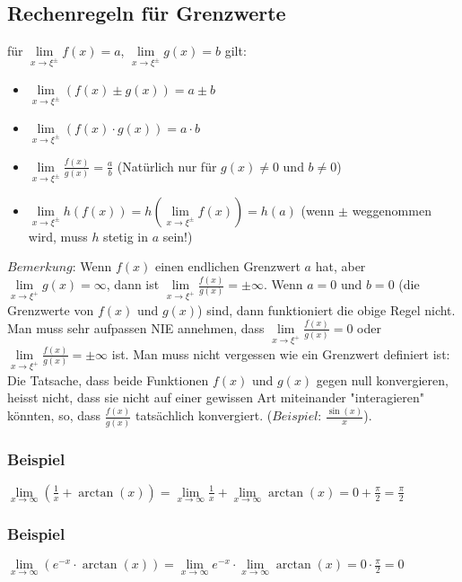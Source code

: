 \documentclass[11pt]{article} %
\begin{document}
\subsection{Rechenregeln für Grenzwerte}

für $\lim\limits_{x\rightarrow \xi^\pm}f(x) = a$,  $\lim\limits_{x\rightarrow\xi^\pm}g(x)= b$ gilt:
\begin{itemize}
\item $\lim\limits_{x\rightarrow \xi^\pm}(f(x)\pm g(x))= a\pm b$
\item $\lim\limits_{x\rightarrow \xi^\pm}(f(x)\cdot g(x))= a\cdot b$
\item $\lim\limits_{x\rightarrow \xi^\pm}\frac{f(x)}{g(x)}= \frac{a}{b}$ (Natürlich nur für $g(x)\neq 0$ und $b \neq 0$)
\item $\lim\limits_{x\rightarrow \xi^\pm} h(f(x)) = h(\lim\limits_{x\rightarrow \xi^\pm} f(x)) = h(a)$ (wenn $\pm$ weggenommen wird, muss $h$ stetig in $a$ sein!)
\end{itemize}
$Bemerkung$: Wenn $f(x)$ einen endlichen Grenzwert $a$ hat, aber $\lim\limits_{x\rightarrow\xi^+}g(x)= \infty$, dann ist $\lim\limits_{x\rightarrow \xi^+}\frac{f(x)}{g(x)}=\pm \infty$.
Wenn $a=0$ und $b=0$ (die Grenzwerte von $f(x)$ und $g(x)$) sind, dann funktioniert die obige Regel nicht. Man muss sehr aufpassen NIE annehmen, dass $\lim\limits_{x\rightarrow \xi^+}\frac{f(x)}{g(x)}= 0$ oder  $\lim\limits_{x\rightarrow \xi^+}\frac{f(x)}{g(x)}=\pm \infty$ ist. Man muss nicht vergessen wie ein Grenzwert definiert ist: Die Tatsache, dass beide Funktionen $f(x)$ und  $g(x)$ gegen null konvergieren, heisst nicht, dass sie nicht auf einer gewissen Art miteinander "interagieren" könnten, so, dass $\frac{f(x)}{g(x)}$ tatsächlich konvergiert. ($Beispiel$:  $\frac{\sin(x)}{x}$).

\subsubsection{Beispiel}

$\lim\limits_{x\rightarrow \infty}(\frac{1}{x}+\arctan(x)) =\lim\limits_{x\rightarrow \infty}\frac{1}{x} + \lim\limits_{x\rightarrow \infty}\arctan(x) = 0 + \frac{\pi}{2} = \frac{\pi}{2}$ 

\subsubsection{Beispiel}
$\lim\limits_{x\rightarrow \infty}(e^{-x}\cdot\arctan(x)) =\lim\limits_{x\rightarrow \infty}e^{-x} \cdot \lim\limits_{x\rightarrow \infty}\arctan(x) = 0 \cdot \frac{\pi}{2} = 0$ 
\end{document}
